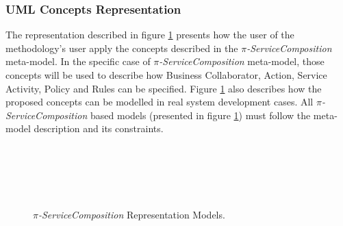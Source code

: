  \subsubsection{UML Concepts Representation} 
 
 
 

The representation described in figure \ref{fig:picomposition_representation}
presents how the user of the methodology's user apply the concepts described in
the \textit{$\pi$-ServiceComposition} meta-model. In the specific case
of \textit{$\pi$-ServiceComposition} meta-model, those concepts will be used to
describe how {\sc Business Collaborator, Action, Service Activity, Policy and
Rules} can be specified. Figure \ref{fig:picomposition_representation}
also describes how the proposed concepts can be modelled in real system
development cases. All \textit{$\pi$-ServiceComposition} based models
(presented in figure \ref{fig:picomposition_representation}) must follow the
meta-model description and its constraints.
 

\begin{figure}[ht!]
  \centering
  ~ %
  \\
  ~
  \\
  ~ %
  \\
  ~ %
  \caption{\textit{$\pi$-ServiceComposition} Representation Models.}
  \label{fig:picomposition_representation}
\end{figure}

